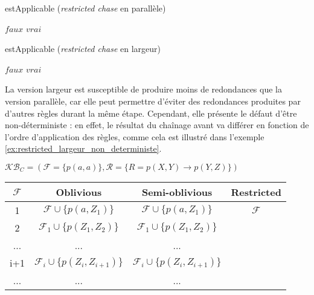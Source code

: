 \begin{algorithm}[H]\label{algo:est_applicable_restricted_parallel}
\caption{estApplicable (\textit{restricted chase} en parallèle)}
\SetAlgoLined
\DontPrintSemicolon
{}
    {
        \Return $faux$
    }
\Return $vrai$
\end{algorithm}
\pagebreak
\begin{algorithm}[H]\label{algo:est_applicable_restricted_largeur}
\caption{estApplicable (\textit{restricted chase} en largeur)}
\SetAlgoLined
\DontPrintSemicolon
{}
    {
        \Return $faux$
    }
\Return $vrai$
\end{algorithm}

\par La version largeur est susceptible de produire moins de redondances que la version parallèle, car elle peut permettre d'éviter des redondances produites par d'autres règles durant la même étape. Cependant, elle présente le défaut d'être non-déterministe : en effet, le résultat du chaînage avant va différer en fonction de l'ordre d'application des règles, comme cela est illustré dans l'exemple \ref{ex:restricted_largeur_non_deterministe}.

\begin{example}
$\mathcal{KB}_C = (\mathcal{F} = \{p(a,a)\}, \mathcal{R} = \{R = p(X,Y) \rightarrow p(Y,Z) \})$

\begin{center}
\begin{tabular}{|c|c|c|c|}
    \hline
    $\mathcal{F}$ & Oblivious & Semi-oblivious & Restricted \\ 
    \hline
    1 &$\mathcal{F} \cup \{p(a, Z_1)\}$ & $\mathcal{F} \cup \{p(a, Z_1)\} $&  $\mathcal{F}$ \\ 
    \hline
    2 &$\mathcal{F}_1 \cup \{p(Z_1, Z_2)\}$ &$\mathcal{F}_1 \cup \{p(Z_1, Z_2)\}$ & \\
    \hline
    ... & ... & ... & \\
    \hline
    i+1 & $\mathcal{F}_i \cup \{p(Z_{i}, Z_{i+1})\} $& $\mathcal{F}_i \cup \{p(Z_{i}, Z_{i+1})\} $&   \\
     \hline
     ... & ... & ... & \\
     \hline
\end{tabular}
\end{center}
\end{example}

